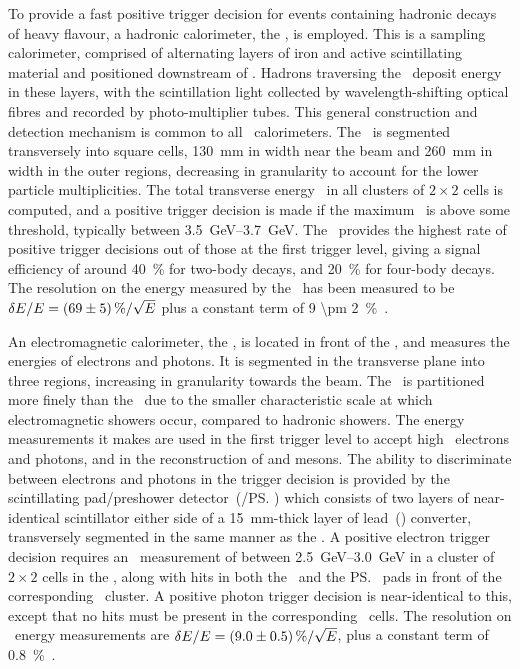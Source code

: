 To provide a fast positive trigger decision for events containing hadronic 
decays of heavy flavour, a hadronic calorimeter, the \hcal, is employed.
This is a sampling calorimeter, comprised of alternating layers of iron and 
active scintillating material and positioned downstream of \richtwo.
Hadrons traversing the \hcal\ deposit energy in these layers, with the 
scintillation light collected by wavelength-shifting optical fibres and 
recorded by photo-multiplier tubes.
This general construction and detection mechanism is common to all \lhcb\ 
calorimeters.
The \hcal\ is segmented transversely into square cells, \SI{130}{\milli\metre} 
in width near the beam and \SI{260}{\milli\metre} in width in the outer 
regions, decreasing in granularity to account for the lower particle 
multiplicities.
The total transverse energy \ET\ in all clusters of $2\times2$ cells is 
computed, and a positive trigger decision is made if the maximum \ET\ is above 
some threshold, typically between \SIrange{3.5}{3.7}{\GeV}.
The \hcal\ provides the highest rate of positive trigger decisions out of those 
at the first trigger level, giving a signal efficiency of around 
\SI{40}{\percent} for two-body \PB decays, and \SI{20}{\percent} for four-body 
\PD decays.
The resolution on the energy measured by the \hcal\ has been measured to be 
$\unc{E}/E = \SI{69 \pm 5}{\percent}/\sqrt{E}$ plus a constant term of \SI{9 
  \pm 2}{\percent}~\cite{Perret:2015pla}.

An electromagnetic calorimeter, the \ecal, is located in front of the \hcal, 
and measures the energies of electrons and photons.
It is segmented in the transverse plane into three regions, increasing in 
granularity towards the beam.
The \ecal\ is partitioned more finely than the \hcal\ due to the smaller 
characteristic scale at which electromagnetic showers occur, compared to 
hadronic showers.
The energy measurements it makes are used in the first trigger level to accept 
high \ET\ electrons and photons, and in the reconstruction of \Ppizero and 
\Peta mesons.
The ability to discriminate between electrons and photons in the trigger 
decision is provided by the scintillating pad/preshower detector~(\spd/\ps) 
which consists of two layers of near-identical scintillator either side of a 
\SI{15}{\milli\metre}-thick layer of lead~(\ce{Pb}) converter, transversely 
segmented in the same manner as the \ecal.
A positive electron trigger decision requires an \ET\ measurement of between 
\SIrange{2.5}{3.0}{\GeV} in a cluster of $2\times2$ cells in the \ecal, along 
with hits in both the \spd\ and the \ps\ pads in front of the corresponding 
\ecal\ cluster.  A positive photon trigger decision is near-identical to this, 
except that no hits must be present in the corresponding \spd\ cells.
The resolution on \ecal\ energy measurements are $\unc{E}/E = \SI{9 \pm 
  0.5}{\percent}/\sqrt{E}$, plus a constant term of 
\SI{0.8}{\percent}~\cite{Perret:2015pla}.

